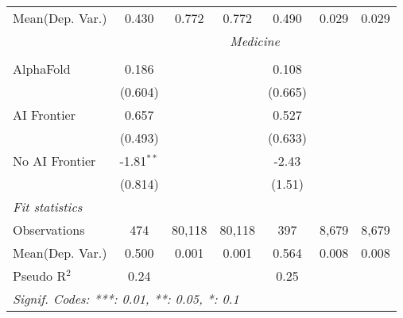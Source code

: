 \begin{tabular}{lcccccc}
Mean(Dep. Var.) & 0.430 & 0.772 & 0.772 & 0.490 & 0.029 & 0.029 \\
 & \multicolumn{6}{c}{\textit{Medicine}} \\ \\
   AlphaFold      & 0.186        &        &        & 0.108     &       &   \\   
                  & (0.604)      &        &        & (0.665)   &       &   \\   
   AI Frontier    & 0.657        &        &        & 0.527     &       &   \\   
                  & (0.493)      &        &        & (0.633)   &       &   \\   
   No AI Frontier & -1.81$^{**}$ &        &        & -2.43     &       &   \\   
                  & (0.814)      &        &        & (1.51)    &       &   \\   
   \midrule
   \emph{Fit statistics}\\
   Observations   & 474          & 80,118 & 80,118 & 397       & 8,679 & 8,679\\  
Mean(Dep. Var.) & 0.500 & 0.001 & 0.001 & 0.564 & 0.008 & 0.008 \\
   Pseudo R$^2$   & 0.24         &        &        & 0.25      &       & \\  
   \midrule \midrule
   \multicolumn{7}{l}{\emph{Signif. Codes: ***: 0.01, **: 0.05, *: 0.1}}\\
\end{tabular}
\par\endgroup
